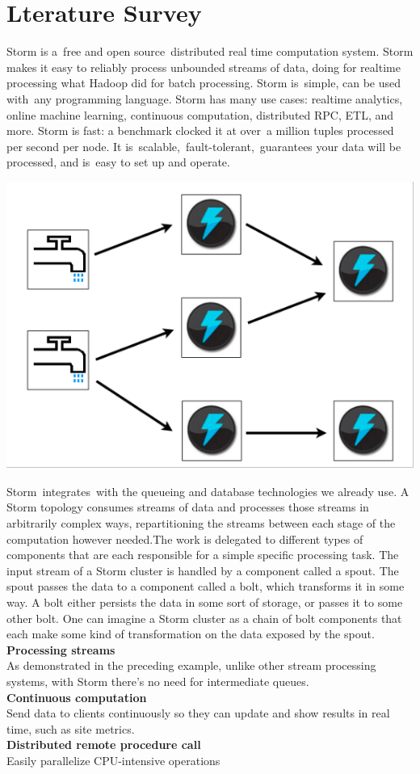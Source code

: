 \chapter{Lterature Survey} 
\thispagestyle{plain} 
Storm is a free and open source distributed real time computation system. Storm makes it easy to reliably process unbounded streams of data, doing for realtime processing what Hadoop did for batch processing. Storm is simple, can be used with any programming language.
Storm has many use cases: realtime analytics, online machine learning, continuous computation, distributed RPC, ETL, and more. Storm is fast: a benchmark clocked it at over a million tuples processed per second per node. It is scalable, fault-tolerant, guarantees your data will be processed, and is easy to set up and operate.
\begin{center}
\includegraphics[scale=.5]{../img/img4} \\[2mm]
\end{center}
Storm integrates with the queueing and database technologies we already use. A Storm topology consumes streams of data and processes those streams in arbitrarily complex ways, repartitioning the streams between each stage of the computation however needed.The work is delegated to different types of components that are each responsible for a simple specific processing task. The input stream of a Storm cluster is handled by a component called a spout. The spout passes the data to a component called a bolt, which transforms it in some way. A bolt either persists the data in some sort of storage, or passes it to some other bolt. One can imagine a Storm cluster as a chain of bolt components that each make some kind of transformation on the data exposed by the spout.\\[2mm]
{\bfseries Processing streams} \\[2mm]
As demonstrated in the preceding example, unlike other stream processing systems,
with Storm there’s no need for intermediate queues.\\[2mm]
{\bfseries Continuous computation} \\[2mm]
Send data to clients continuously so they can update and show results in real time,
such as site metrics.\\[2mm]
{\bfseries Distributed remote procedure call} \\[2mm]
Easily parallelize CPU-intensive operations
